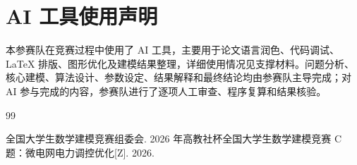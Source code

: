 %
%

\section{AI 工具使用声明}

本参赛队在竞赛过程中使用了 AI 工具，主要用于论文语言润色、代码调试、\LaTeX{} 排版、图形优化及建模结果整理，详细使用情况见支撑材料。问题分析、核心建模、算法设计、参数设定、结果解释和最终结论均由参赛队主导完成；对 AI 参与完成的内容，参赛队进行了逐项人工审查、程序复算和结果核验。

\vspace{0.5\baselineskip}
\begin{thebibliography}{99}

 全国大学生数学建模竞赛组委会. 2026 年高教社杯全国大学生数学建模竞赛 C 题：微电网电力调控优化[Z]. 2026.


\end{thebibliography}
